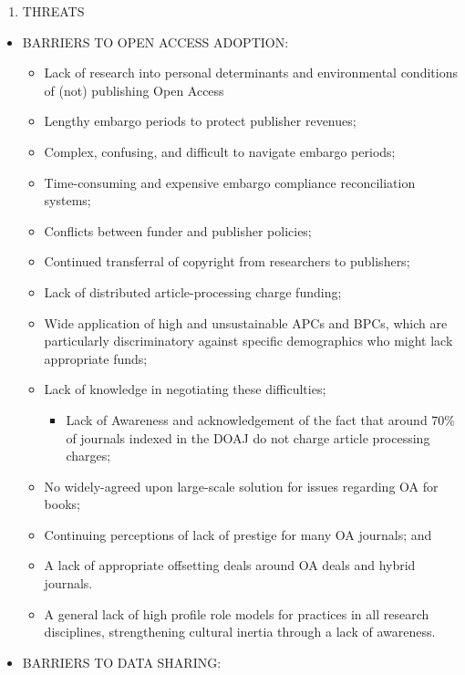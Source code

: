 \documentclass[]{article}
\providecommand{\tightlist}{%
  \setlength{\itemsep}{0pt}\setlength{\parskip}{0pt}}
\begin{document}
\begin{enumerate}
\def\labelenumi{\arabic{enumi}.}
\setcounter{enumi}{8}
\tightlist
\item
  THREATS
\end{enumerate}

\begin{itemize}
\item
  BARRIERS TO OPEN ACCESS ADOPTION:

  \begin{itemize}
  \item
    Lack of research into personal determinants and environmental
    conditions of (not) publishing Open Access
  \item
    Lengthy embargo periods to protect publisher revenues;
  \item
    Complex, confusing, and difficult to navigate embargo periods;
  \item
    Time-consuming and expensive embargo compliance reconciliation
    systems;
  \item
    Conflicts between funder and publisher policies;
  \item
    Continued transferral of copyright from researchers to publishers;
  \item
    Lack of distributed article-processing charge funding;
  \item
    Wide application of high and unsustainable APCs and BPCs, which are
    particularly discriminatory against specific demographics who might
    lack appropriate funds;
  \item
    Lack of knowledge in negotiating these difficulties;

    \begin{itemize}
    \tightlist
    \item
      Lack of Awareness and acknowledgement of the fact that around 70\%
      of journals indexed in the DOAJ do not charge article processing
      charges;
    \end{itemize}
  \item
    No widely-agreed upon large-scale solution for issues regarding OA
    for books;
  \item
    Continuing perceptions of lack of prestige for many OA journals; and
  \item
    A lack of appropriate offsetting deals around OA deals and hybrid
    journals.
  \item
    A general lack of high profile role models for practices in all
    research disciplines, strengthening cultural inertia through a lack
    of awareness.
  \end{itemize}
\item
  BARRIERS TO DATA SHARING:


\end{itemize}
\end{document}
